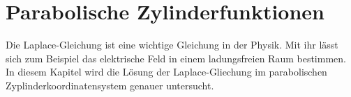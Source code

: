 %
%
%
\chapter{Parabolische Zylinderfunktionen\label{chapter:parzyl}}
\begin{refsection}

Die Laplace-Gleichung ist eine wichtige Gleichung in der Physik.
Mit ihr lässt sich zum Beispiel das elektrische Feld in einem ladungsfreien Raum bestimmen.
In diesem Kapitel wird die Lösung der Laplace-Gliechung im 
parabolischen Zyplinderkoordinatensystem genauer untersucht.






\printbibliography[heading=subbibliography]
\end{refsection}
